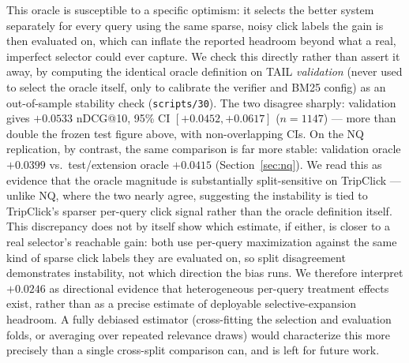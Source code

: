 \documentclass[conference]{IEEEtran}
\begin{document}
This oracle is susceptible to a specific optimism: it selects the
better system separately for every query using the same sparse,
noisy click labels the gain is then evaluated on, which can inflate
the reported headroom beyond what a real, imperfect selector could
ever capture. We check this directly rather than assert it away, by
computing the identical oracle definition on TAIL \emph{validation}
(never used to select the oracle itself, only to calibrate the
verifier and BM25 config) as an out-of-sample stability check
(\texttt{scripts/30}). The two disagree sharply: validation gives
$+0.0533$ nDCG@10, 95\% CI $[+0.0452,+0.0617]$ ($n{=}1147$) ---
more than double the frozen test figure above, with non-overlapping
CIs. On the NQ replication, by contrast, the same comparison is far
more stable: validation oracle $+0.0399$ vs.\ test/extension oracle
$+0.0415$ (Section~\ref{sec:nq}). We read this as evidence that the
oracle magnitude is substantially split-sensitive on TripClick ---
unlike NQ, where the two nearly agree, suggesting the instability is
tied to TripClick's sparser per-query click signal rather than the
oracle definition itself. This discrepancy does not by itself show
which estimate, if either, is closer to a real selector's reachable
gain: both use per-query maximization against the same kind of sparse
click labels they are evaluated on, so split disagreement demonstrates
instability, not which direction the bias runs. We therefore interpret
$+0.0246$ as directional evidence that heterogeneous per-query
treatment effects exist, rather than as a precise estimate of
deployable selective-expansion headroom. A fully debiased estimator
(cross-fitting the
selection and evaluation folds, or averaging over repeated relevance
draws) would characterize this more precisely than a single
cross-split comparison can, and is left for future work.
\end{document}
